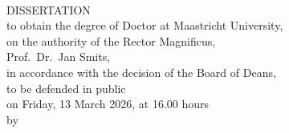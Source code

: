 \thispagestyle{empty}
\centering
\vspace*{4cm}

{\LARGE \textbf{\thesistitle}}\\[2cm]


{\large DISSERTATION}\\[1cm]

{\normalsize
to obtain the degree of Doctor at Maastricht University,\\
on the authority of the Rector Magnificus,\\
Prof.\ Dr.\ Jan Smits,\\
in accordance with the decision of the Board of Deans,\\
to be defended in public\\
on Friday, 13 March 2026, at 16.00 hours\\[1cm]
by\\[0.5cm]
\textbf{\thesisauthor}
}

\vfill
\clearpage
